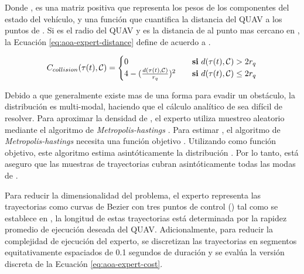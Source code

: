 Donde ,  es una matriz positiva que representa los pesos de los componentes del estado del vehículo, y  una función que cuantifica la distancia del QUAV a los puntos de . Si  es el radio del QUAV y  es la distancia de  al punto mas cercano en , la Ecuación \ref{eq:aoa-expert-distance} define  de acuerdo a \cite{Loquercio2021}.

\begin{equation}
\label{eq:aoa-expert-distance}
    C_{collision}(\tau(t), \mathcal{C}) = \begin{cases}
        0                                               & \quad\text{\textbf{si} } d(\tau(t), \mathcal{C}) > 2 r_q \\
        4 - (\frac{d(\tau(t), \mathcal{C})}{r_q})^{2}   & \quad\text{\textbf{si} } d(\tau(t), \mathcal{C}) \leq 2 r_q
    \end{cases}
\end{equation}

Debido a que generalmente existe mas de una forma para evadir un obstáculo, la distribución  es multi-modal, haciendo que el cálculo analítico de  sea difícil de resolver. Para aproximar la densidad de , el experto utiliza muestreo aleatorio mediante el algoritmo de \textit{Metropolis-hastings} \cite{hastings1970monte}. Para estimar , el algoritmo de \textit{Metropolis-hastings} necesita una función objetivo . Utilizando  como función objetivo, este algoritmo estima asintóticamente la distribución  \cite{Loquercio2021}. Por lo tanto, está aseguro que las muestras de trayectorias cubran asintóticamente todas las modas de .

Para reducir la dimensionalidad del problema, el experto representa las trayectorias \jim{\tau} como curvas de Bezier con tres puntos de control () tal como se establece en \cite{mellinger2011minimum}, la longitud de estas trayectorias está determinada por la rapidez promedio de ejecución deseada del QUAV. Adicionalmente, para reducir la complejidad de ejecución del experto, se discretizan las trayectorias en segmentos equitativamente espaciados de 0.1 segundos de duración y se evalúa la versión discreta de la Ecuación \ref{eq:aoa-expert-cost}.

